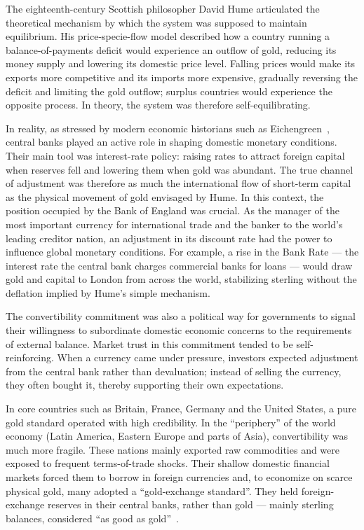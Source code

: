 The eighteenth-century Scottish philosopher David Hume articulated the theoretical mechanism by which the system was supposed to maintain equilibrium. His price-specie-flow model described how a country running a balance-of-payments deficit would experience an outflow of gold, reducing its money supply and lowering its domestic price level. Falling prices would make its exports more competitive and its imports more expensive, gradually reversing the deficit and limiting the gold outflow; surplus countries would experience the opposite process. In theory, the system was therefore self-equilibrating.
 
In reality, as stressed by modern economic historians such as Eichengreen~\cite{Eichengreen1996}, central banks played an active role in shaping domestic monetary conditions. Their main tool was interest-rate policy: raising rates to attract foreign capital when reserves fell and lowering them when gold was abundant. The true channel of adjustment was therefore as much the international flow of short-term capital as the physical movement of gold envisaged by Hume. In this context, the position occupied by the Bank of England was crucial. As the manager of the most important currency for international trade and the banker to the world's leading creditor nation, an adjustment in its discount rate had the power to influence global monetary conditions. For example, a rise in the Bank Rate --- the interest rate the central bank charges commercial banks for loans --- would draw gold and capital to London from across the world, stabilizing sterling without the deflation implied by Hume's simple mechanism.
 
The convertibility commitment was also a political way for governments to signal their willingness to subordinate domestic economic concerns to the requirements of external balance. Market trust in this commitment tended to be self-reinforcing. When a currency came under pressure, investors expected adjustment from the central bank rather than devaluation; instead of selling the currency, they often bought it, thereby supporting their own expectations.
 
In core countries such as Britain, France, Germany and the United States, a pure gold standard operated with high credibility. In the ``periphery'' of the world economy (Latin America, Eastern Europe and parts of Asia), convertibility was much more fragile. These nations mainly exported raw commodities and were exposed to frequent terms-of-trade shocks. Their shallow domestic financial markets forced them to borrow in foreign currencies and, to economize on scarce physical gold, many adopted a ``gold-exchange standard''. They held foreign-exchange reserves in their central banks, rather than gold --- mainly sterling balances, considered ``as good as gold''~\cite{Eichengreen1996,EichengreenHausmannPanizza2003}.
